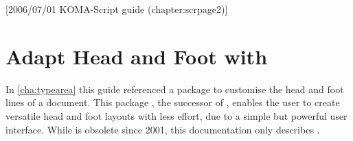 %
%
%
%
%
%
%
%
% 
%
%
%
%

[2006/07/01 KOMA-Script guide (chapter:scrpage2)]

\chapter{Adapt Head and Foot with }

%
%
%
In \autoref{cha:typearea} this guide referenced a package
to customise the head and foot lines of a document.
This package , the successor of ,
enables the user to create versatile head and foot layouts with
less effort, due to a simple but powerful user interface. While
 is obsolete since 2001, this documentation only describes
.

